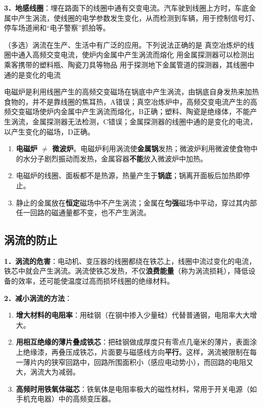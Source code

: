 \noindent\textbf{3．地感线圈}：埋在路面下的线圈中通有交变电流。汽车驶到线圈上方时，车底金属中产生涡流，使线圈的电学参数发生变化，从而检测到车辆，用于控制信号灯、停车场道闸和“电子警察”抓拍等。

\begin{liti}
（多选）涡流在生产、生活中有广泛的应用。下列说法正确的是
%
{真空冶炼炉的线圈中通入高频交变电流，使炉内金属中产生涡流而熔化}%
{用金属探测器可以检测出乘客携带的塑料瓶、陶瓷刀具等物品}%
{用于探测地下金属管道的探测器，其线圈中通的是变化的电流}
\begin{jiexi}[2cm]
电磁炉是利用线圈产生的高频交变磁场在锅底中产生涡流，由锅底自身发热来加热食物的，并不是靠线圈的焦耳热，A错误；真空冶炼炉中，高频交变电流产生的高频交变磁场使炉内金属中产生涡流而熔化，B正确；塑料、陶瓷是绝缘体，不能产生涡流，金属探测器无法检测，C错误；金属探测器的线圈中通的是变化的电流，以产生变化的磁场，D正确。
\end{jiexi}
\end{liti}

\begin{yicuo}
\begin{enumerate}[label=（\arabic*）,leftmargin=2.4em]
  \item \textbf{电磁炉 $\ne$ 微波炉}。电磁炉利用涡流使\textbf{金属锅}发热；微波炉利用微波使食物中的水分子剧烈振动而发热，金属容器\textbf{不能}放入微波炉中加热。
  \item 电磁炉的线圈、面板都不是热源，热量产生于\textbf{锅底}；锅离开面板后加热即停止。
  \item 静止的金属放在\textbf{恒定}磁场中不产生涡流；金属在\textbf{匀强}磁场中平动，穿过其内部任一回路的磁通量都不变，也不产生涡流。
\end{enumerate}
\end{yicuo}

\subsection{涡流的防止}

\noindent\textbf{1．涡流的危害}：电动机、变压器的线圈都绕在铁芯上，线圈中流过变化的电流，铁芯中就会产生涡流。涡流使铁芯发热，不仅\textbf{浪费能量}（称为涡流损耗），降低设备的效率，还可能使温度过高而损坏线圈的绝缘材料。

\noindent\textbf{2．减小涡流的方法}：
\begin{enumerate}[label=（\arabic*）,leftmargin=2.6em]
  \item \textbf{增大材料的电阻率}：用硅钢（在钢中掺入少量硅）代替普通钢，电阻率大大增大。
  \item \textbf{用相互绝缘的薄片叠成铁芯}：把硅钢做成厚度只有零点几毫米的薄片，表面涂上绝缘漆，再叠压成铁芯，片面要与磁感线方向\textbf{平行}。这样，涡流被限制在每一薄片内的狭窄回路中，回路所围面积小（感应电动势小），而回路的电阻又大，涡流大为减弱。
  \item \textbf{高频时用铁氧体磁芯}：铁氧体是电阻率极大的磁性材料，常用于开关电源（如手机充电器）中的高频变压器。
\end{enumerate}


